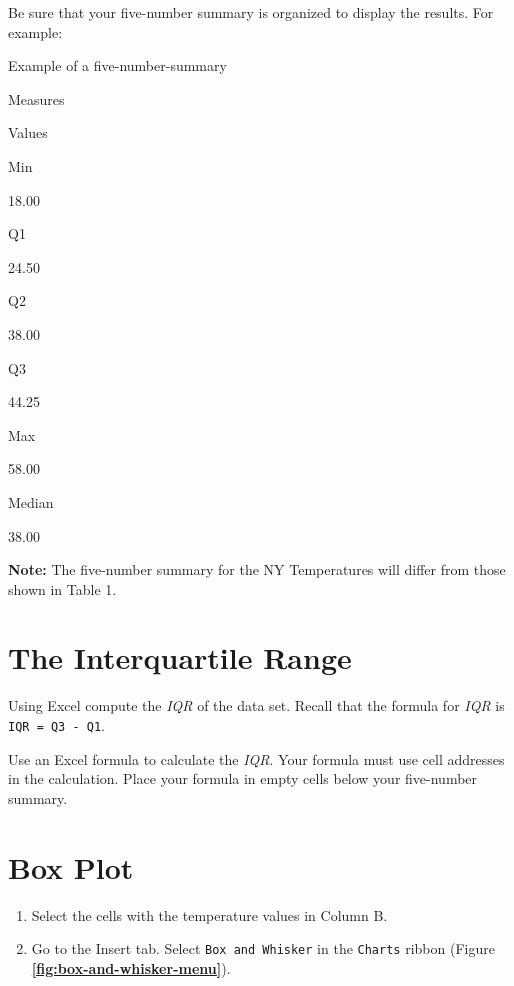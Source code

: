 \documentclass[
]{book}
\providecommand{\tightlist}{%
  \setlength{\itemsep}{0pt}\setlength{\parskip}{0pt}}
\begin{document}
Be sure that your five-number summary is organized to display the results. For example:

\label{tab:unnamed-chunk-2}Example of a five-number-summary

Measures

Values

Min

18.00

Q1

24.50

Q2

38.00

Q3

44.25

Max

58.00

Median

38.00

\textbf{Note:} The five-number summary for the NY Temperatures will differ from those shown in Table 1.

\hypertarget{the-interquartile-range}{%
\section{The Interquartile Range}\label{the-interquartile-range}}

Using Excel compute the \emph{IQR} of the data set. Recall that the formula for \emph{IQR} is \texttt{IQR\ =\ Q3\ -\ Q1}.

Use an Excel formula to calculate the \emph{IQR}. Your formula must use cell addresses in the calculation. Place your formula in empty cells below your five-number summary.

\hypertarget{box-plot}{%
\section{Box Plot}\label{box-plot}}

\begin{enumerate}
\def\labelenumi{\arabic{enumi}.}
\tightlist
\item
  Select the cells with the temperature values in Column B.
\item
  Go to the Insert tab. Select \texttt{Box\ and\ Whisker} in the \texttt{Charts} ribbon (Figure \textbf{\ref{fig:box-and-whisker-menu}}).
\end{enumerate}
\end{document}
